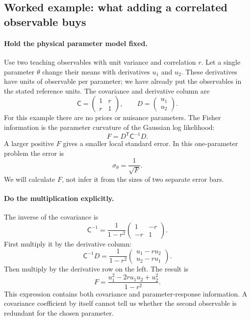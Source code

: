 \documentclass[11pt]{article}
\newcommand{\Cov}{\mathsf{C}}
\newcommand{\T}{^{\mathsf{T}}}
\begin{document}
\subsection{Worked example: what adding a correlated observable buys}
\label{sec:joint-information}
\paragraph{Hold the physical parameter model fixed.}
Use two teaching observables with unit variance and correlation $r$.
Let a single parameter $\theta$ change their means with derivatives
$u_1$ and $u_2$. These derivatives have units of observable per parameter;
we have already put the observables in the stated reference units. The
covariance and derivative column are
\begin{equation}
 \Cov=\begin{pmatrix}1&r\\r&1\end{pmatrix},
 \qquad D=\begin{pmatrix}u_1\\u_2\end{pmatrix}.
\end{equation}
For this example there are no priors or nuisance parameters. The Fisher
information is the parameter curvature of the Gaussian log likelihood:
\begin{equation}
 F=D\T\Cov^{-1}D.
\end{equation}
A larger positive $F$ gives a smaller local standard error. In this
one-parameter problem the error is
\begin{equation}
 \sigma_\theta=\frac1{\sqrt F}.
\end{equation}
We will calculate $F$, not infer it from the sizes of two separate error
bars.

\paragraph{Do the multiplication explicitly.}
The inverse of the covariance is
\begin{equation}
 \Cov^{-1}=\frac1{1-r^2}
                \begin{pmatrix}1&-r\\-r&1\end{pmatrix}.
\end{equation}
First multiply it by the derivative column:
\begin{equation}
 \Cov^{-1}D=\frac1{1-r^2}
               \begin{pmatrix}u_1-r u_2\\u_2-r u_1\end{pmatrix}.
\end{equation}
Then multiply by the derivative row on the left. The result is
\begin{equation}
 F=\frac{u_1^2-2r u_1u_2+u_2^2}{1-r^2}.
\end{equation}
This expression contains both covariance and parameter-response information.
A covariance coefficient by itself cannot tell us whether the second
observable is redundant for the chosen parameter.
\end{document}
